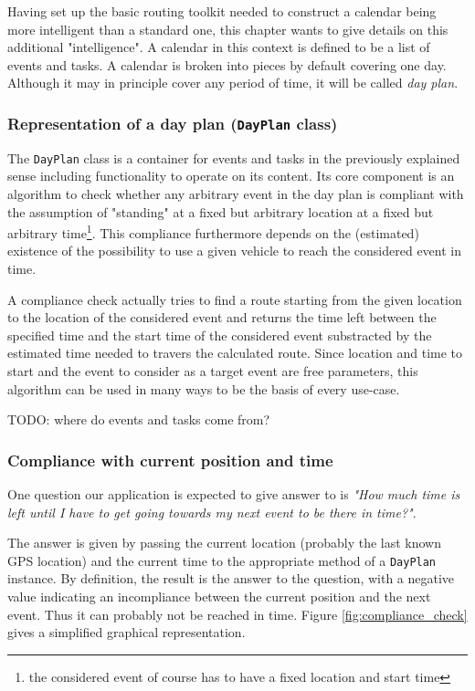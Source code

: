 Having set up the basic routing toolkit needed to construct a calendar being more intelligent than a standard one, this chapter wants to give details on this additional "intelligence". A calendar in this context is defined to be a list of events and tasks. A calendar is broken into pieces by default covering one day. Although it may in principle cover any period of time, it will be called \emph{day plan}.

\subsubsection{Representation of a day plan (\texttt{DayPlan} class)}

The \texttt{DayPlan} class is a container for events and tasks in the previously explained sense including functionality to operate on its content. Its core component is an algorithm to check whether any arbitrary event in the day plan is compliant with the assumption of "standing" at a fixed but arbitrary location at a fixed but arbitrary time\footnote{the considered event of course has to have a fixed location and start time}. This compliance furthermore depends on the (estimated) existence of the possibility to use a given vehicle to reach the considered event in time.\newline

A compliance check actually tries to find a route starting from the given location to the location of the considered event and returns the time left between the specified time and the start time of the considered event substracted by the estimated time needed to travers the calculated route. Since location and time to start and the event to consider as a target event are free parameters, this algorithm can be used in many ways to be the basis of every use-case.\newline

TODO: where do events and tasks come from?

\subsubsection{Compliance with current position and time}
 
One question our application is expected to give answer to is \emph{"How much time is left until I have to get going towards my next event to be there in time?"}.\newline

The answer is given by passing the current location (probably the last known GPS location) and the current time to the appropriate method of a \texttt{DayPlan} instance. By definition, the result is the answer to the question, with a negative value indicating an incompliance between the current position and the next event. Thus it can probably not be reached in time. Figure \ref{fig:compliance_check} gives a simplified graphical representation.


